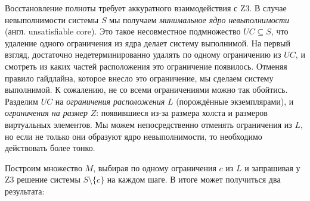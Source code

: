 Восстановление полноты требует аккуратного взаимодействия с \textsc{Z3}.
В случае невыполнимости системы $S$ мы получаем \emph{минимальное ядро невыполнимости}~\cite{minUnsatCore} (англ. unsatisfiable core).
Это такое несовместное подмножество  $UC\subseteq S$, что удаление одного ограничения из ядра делает систему выполнимой.
На первый взгляд, достаточно недетерминированно удалять по одному ограничению из $UC$, и смотреть из каких частей расположения это ограничение появилось.
Отменяя правило гайдлайна, которое внесло это ограничение, мы сделаем систему выполнимой.
К сожалению, не со всеми ограничениями можно так обойтись.
Разделим $UC$ на \emph{ограничения расположения } $L$ (порождённые экземплярами), и \emph{ограничения на размер} $Z$: появившиеся из-за размера холста и размеров виртуальных элементов. Мы можем непосредственно отменять ограничения из $L$, но если не только они образуют ядро невыполнимости, то необходимо действовать более тонко.



Построим множество $M$, выбирая по одному ограничения  $c$ из $L$ и запрашивая у  \textsc{Z3} решение системы $S\setminus\{c\}$  на каждом шаге.
В итоге может получиться два результата:

